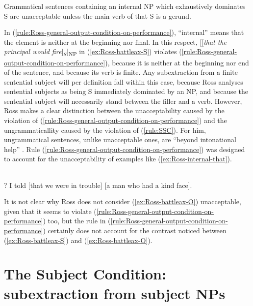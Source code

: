 \ea\label{rule:Ross-general-output-condition-on-performance} Grammatical sentences containing an internal NP which exhaustively dominates S are unacceptable unless the main verb of that S is a gerund. \citep[251]{Ross.1967}
\z 

In (\ref{rule:Ross-general-output-condition-on-performance}), ``internal'' means that the element is neither at the beginning nor final. In this respect, [[\emph{that the principal would fire}]$_S$]\textsubscript{NP} in (\ref{ex:Ross-battleax-S}) violates (\ref{rule:Ross-general-output-condition-on-performance}), because it is neither at the beginning nor end of the sentence, and because its verb is finite. Any subextraction from a finite sentential subject will per definition fall within this case, because Ross analyses sentential subjects as being S immediately dominated by an NP, and because the sentential subject will necessarily stand between the filler and a verb. However, Ross makes a clear distinction between the unacceptability caused by the violation of (\ref{rule:Ross-general-output-condition-on-performance}) and the ungrammaticallity caused by the violation of (\ref{rule:SSC}). For him, ungrammatical sentences, unlike unacceptable ones, are ``beyond intonational help'' \citep[247]{Ross.1967}. Rule (\ref{rule:Ross-general-output-condition-on-performance}) was designed to account for the unacceptability of examples like (\ref{ex:Ross-internal-that}).\largerpage

\eal 
{}
\ex \citep[53]{Ross.1967} \\
? I told [that we were in trouble] [a man who had a kind face].
\label{ex:Ross-internal-that}
\zl 

It is not clear why Ross does not consider (\ref{ex:Ross-battleax-O}) unacceptable, given that it seems to violate (\ref{rule:Ross-general-output-condition-on-performance}) too, but the rule in (\ref{rule:Ross-general-output-condition-on-performance}) certainly does not account for the contrast noticed between (\ref{ex:Ross-battleax-S}) and (\ref{ex:Ross-battleax-O}).



\section{The Subject Condition: subextraction from subject NPs}

